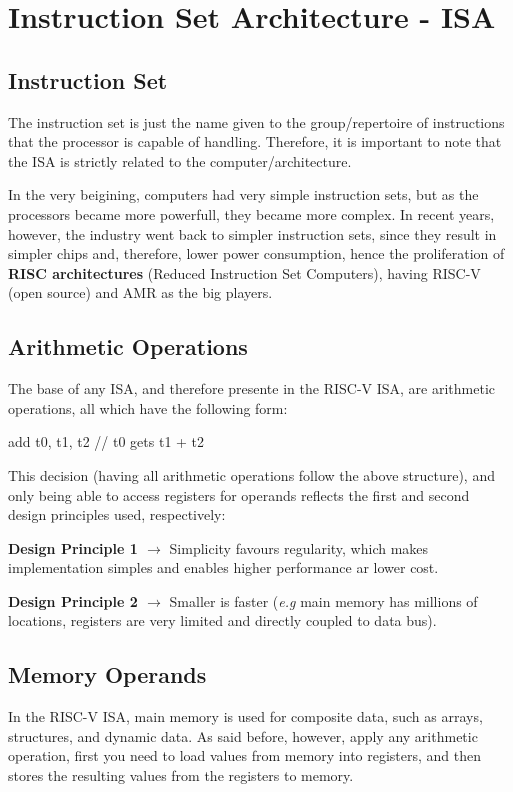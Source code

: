 \documentclass{article}
\begin{document}
\section{Instruction Set Architecture - ISA}
\subsection{Instruction Set}
The instruction set is just the name given to the group/repertoire of instructions that the processor is capable of handling. Therefore, it is important to note that the ISA is strictly related to the computer/architecture. 

In the very beigining, computers had very simple instruction sets, but as the processors became more powerfull, they became more complex. In recent years, however, the industry went back to simpler instruction sets, since they result in simpler chips and, therefore, lower power consumption, hence the proliferation of \textbf{RISC architectures} (Reduced Instruction Set Computers), having RISC-V (open source) and AMR as the big players.

\subsection{Arithmetic Operations}
The base of any ISA, and therefore presente in the RISC-V ISA, are arithmetic operations, all which have the following form:

\begin{center}
    add t0, t1, t2 // t0 gets t1 + t2
\end{center}

This decision (having all arithmetic operations follow the above structure), and only being able to access registers for operands reflects the first and second design principles used, respectively:

\textbf{Design Principle 1 $\rightarrow$} Simplicity favours regularity, which makes implementation simples and enables higher performance ar lower cost.

\textbf{Design Principle 2 $\rightarrow$} Smaller is faster (\emph{e.g} main memory has millions of locations, registers are very limited and directly coupled to data bus).

\subsection{Memory Operands}
In the RISC-V ISA, main memory is used for composite data, such as arrays, structures, and dynamic data. As said before, however, apply any arithmetic operation, first you need to load values from memory into registers, and then stores the resulting values from the registers to memory. 
    
\end{document}
